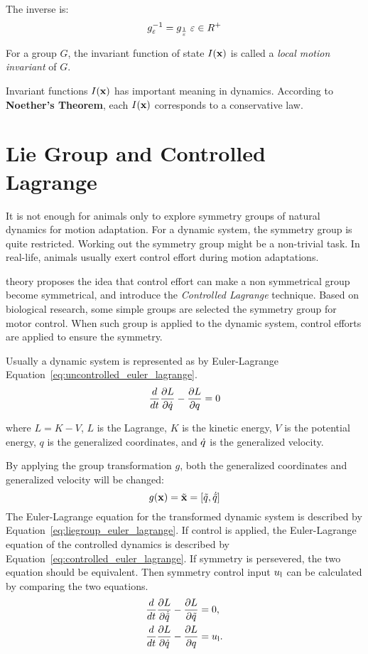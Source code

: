 The inverse is:
\[
g_{\varepsilon}^{-1}=g_{\frac{1}{\varepsilon}} \;\varepsilon \in R^+
\]

\begin{mydef}
For a group $G$, the invariant function of state $I(\mathbf{x})$ is called a \emph{local motion invariant} of $G$. 
\end{mydef}

Invariant functions $I(\mathbf{x})$ has important  meaning in dynamics. 
According  to \textbf{Noether's Theorem}, each $I(\mathbf{x})$ corresponds to a conservative law. 


\section{Lie Group and Controlled Lagrange}
\label{sec:liecontrol}
It is not enough for animals  only to  explore symmetry groups of natural dynamics for motion adaptation.
For a dynamic system, the symmetry group is quite restricted.  
Working out the symmetry group might be a non-trivial task.
In real-life, animals usually exert control effort during motion adaptations.

\moit theory proposes the idea that control effort can make a non symmetrical group become symmetrical, and introduce the \emph{Controlled Lagrange} technique.
Based on biological research\citep{flash2007affine}, some simple groups are selected the symmetry group for motor control.
When such group is applied to the dynamic system, control efforts are applied to ensure the symmetry.


Usually a dynamic system is represented as by Euler-Lagrange Equation~\ref{eq:uncontrolled_euler_lagrange}\citep{Goldstein2002}.
\begin{equation}
\frac{d}{dt} \frac{\partial L}{\partial \dot{q}} - \frac{\partial L}{\partial q} = 0
\label{eq:uncontrolled_euler_lagrange}
\end{equation}

where $L=K-V$, $L$ is the Lagrange, $K$ is the kinetic energy, $V$ is the potential energy, $q$ is the generalized coordinates, and $\dot{q}$ is the generalized velocity.

By applying the group transformation $g$, both the generalized coordinates and generalized velocity will be changed:
\[
g(\mathbf{x})=\tilde{\mathbf{x}}=[\tilde{q}, \dot{\tilde{q}}]
\]
The Euler-Lagrange equation for the transformed dynamic system is described by Equation~\ref{eq:liegroup_euler_lagrange}.
If control is applied, the Euler-Lagrange equation of the controlled dynamics is described by Equation~\ref{eq:controlled_euler_lagrange}. 
If symmetry is persevered, the two equation should be equivalent.
Then symmetry control input $u_{\mathrm{l}}$ can be calculated by comparing the two equations.
\begin{align}
\frac{d}{dt} \frac{\partial L}{\partial \dot{\tilde{q}}} - \frac{\partial L}{\partial \tilde{q} }&=0,\label{eq:liegroup_euler_lagrange}\\
\frac{d}{dt} \frac{\partial L}{\partial \dot{q}} - \frac{\partial L}{\partial q}&=u_{\mathrm{l}}. \label{eq:controlled_euler_lagrange}
\end{align}

